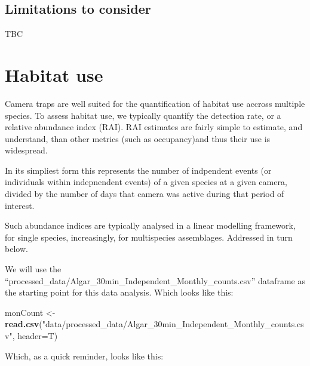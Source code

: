 \documentclass[]{book}
\newenvironment{Shaded}{\begin{snugshade}}{\end{snugshade}}
\newcommand{\KeywordTok}[1]{\textcolor[rgb]{0.13,0.29,0.53}{\textbf{#1}}}
\newcommand{\DataTypeTok}[1]{\textcolor[rgb]{0.13,0.29,0.53}{#1}}
\newcommand{\StringTok}[1]{\textcolor[rgb]{0.31,0.60,0.02}{#1}}
\newcommand{\NormalTok}[1]{#1}
\begin{document}
\section{Limitations to consider}\label{limitations-to-consider}

TBC

\chapter{Habitat use}\label{habitat-use}

Camera traps are well suited for the quantification of habitat use
accross multiple species. To assess habitat use, we typically quantify
the detection rate, or a relative abundance index (RAI). RAI estimates
are fairly simple to estimate, and understand, than other metrics (such
as occupancy)and thus their use is widespread.

In its simpliest form this represents the number of indpendent events
(or individuals within indepnendent events) of a given species at a
given camera, divided by the number of days that camera was active
during that period of interest.

Such abundance indices are typically analysed in a linear modelling
framework, for single species, increasingly, for multispecies
assemblages. Addressed in turn below.

We will use the
``processed\_data/Algar\_30min\_Independent\_Monthly\_counts.csv''
dataframe as the starting point for this data analysis. Which looks like
this:

\begin{Shaded}
\begin{Highlighting}[]
\NormalTok{monCount <-}\StringTok{ }\KeywordTok{read.csv}\NormalTok{(}\StringTok{"data/processed_data/Algar_30min_Independent_Monthly_counts.csv"}\NormalTok{, }\DataTypeTok{header=}\NormalTok{T)}
\end{Highlighting}
\end{Shaded}

Which, as a quick reminder, looks like this:
\end{document}
